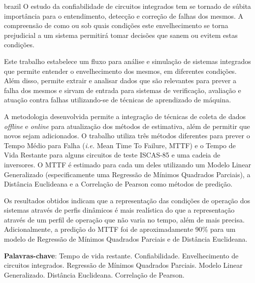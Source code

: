 \begin{resumo}
\begin{otherlanguage*}{brazil}
O estudo da confiabilidade de circuitos integrados tem se tornado de súbita importância para o entendimento, detecção e correção de falhas dos mesmos. A compreensão de como ou sob quais condições este envelhecimento se torna prejudicial a um sistema permitirá tomar decisões que sanem ou evitem estas condições.

Este trabalho estabelece um fluxo para análise e simulação de sistemas integrados que permite entender o envelhecimento dos  mesmos, em diferentes condições. Além disso, permite extrair e analisar dados que são relevantes para prever a falha dos mesmos e sirvam de entrada para sistemas de verificação, avaliação e atuação contra falhas utilizando-se de técnicas de aprendizado de máquina.

A metodologia desenvolvida permite a integração de técnicas de coleta de dados \textit{offline} e \textit{online} para atualização dos métodos de estimativa, além de permitir que novos sejam adicionados. O trabalho utiliza três métodos diferentes para prever o Tempo Médio para Falha (\textit{i.e.} Mean Time To Failure, MTTF) e o Tempo de Vida Restante para alguns circuitos de teste ISCAS-85 e uma cadeia de inversores.
O MTTF é estimado para cada um deles utilizando um Modelo Linear Generalizado (especificamente uma Regressão de Mínimos Quadrados Parciais), a Distância Euclideana e a Correlação de Pearson como métodos de predição.

Os resultados obtidos indicam que a representação das condições de operação dos sistemas através de perfis dinâmicos é mais realística do que a representação através de um perfil de operação que não varia no tempo, além de mais precisa. Adicionalmente, a predição do MTTF foi de aproximadamente 90\% para um modelo de Regressão de Mínimos Quadrados Parciais e de Distância Euclideana.   

\textbf{Palavras-chave}: Tempo de vida restante. Confiabilidade. Envelhecimento de circuitos integrados. Regressão de Mínimos Quadrados Parciais. Modelo Linear Generalizado. Distância Euclideana. Correlação de Pearson.
\end{otherlanguage*}
\end{resumo}
